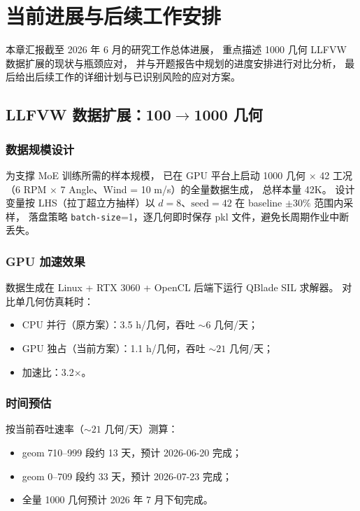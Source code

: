 
\chapter{当前进展与后续工作安排}
\label{chap:plan}

本章汇报截至 2026 年 6 月的研究工作总体进展，
重点描述 1000 几何 LLFVW 数据扩展的现状与瓶颈应对，
并与开题报告中规划的进度安排进行对比分析，
最后给出后续工作的详细计划与已识别风险的应对方案。

\section{LLFVW 数据扩展：100$\to$1000 几何}

\subsection{数据规模设计}

为支撑 MoE 训练所需的样本规模，
已在 GPU 平台上启动 1000 几何 $\times$ 42 工况
（6 RPM $\times$ 7 Angle、Wind = 10 m/s）的全量数据生成，
总样本量 42K。
设计变量按 LHS（拉丁超立方抽样）以 $d = 8$、$\text{seed} = 42$ 在 baseline $\pm 30\%$ 范围内采样，
落盘策略 \texttt{batch-size}=1，逐几何即时保存 pkl 文件，避免长周期作业中断丢失。

\subsection{GPU 加速效果}

数据生成在 Linux + RTX 3060 + OpenCL 后端下运行 QBlade SIL 求解器。
对比单几何仿真耗时：
\begin{itemize}
  \item CPU 并行（原方案）：3.5 h/几何，吞吐 $\sim 6$ 几何/天；
  \item GPU 独占（当前方案）：1.1 h/几何，吞吐 $\sim 21$ 几何/天；
  \item 加速比：3.2$\times$。
\end{itemize}

\subsection{时间预估}

按当前吞吐速率（$\sim 21$ 几何/天）测算：
\begin{itemize}
  \item geom 710--999 段约 13 天，预计 2026-06-20 完成；
  \item geom 0--709 段约 33 天，预计 2026-07-23 完成；
  \item 全量 1000 几何预计 2026 年 7 月下旬完成。
\end{itemize}

